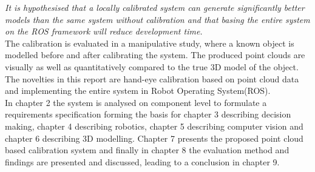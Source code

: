 \textit{It is hypothesised that a locally calibrated system can generate significantly better models than the same system without calibration and that basing the entire system on the ROS framework will reduce development time.} \\

The calibration is evaluated in a manipulative study, where a known object is modelled before and after calibrating the system. The produced point clouds are visually as well as quantitatively compared to the true 3D model of the object. The novelties in this report are hand-eye calibration based on point cloud data and implementing the entire system in Robot Operating System(ROS).\\

In chapter 2 the system is analysed on component level to formulate a requirements specification forming the basis for chapter 3 describing decision making, chapter 4 describing robotics, chapter 5 describing computer vision and chapter 6 describing 3D modelling. Chapter 7 presents the proposed point cloud based calibration system and finally in chapter 8 the evaluation method and findings are presented and discussed, leading to a conclusion in chapter 9.